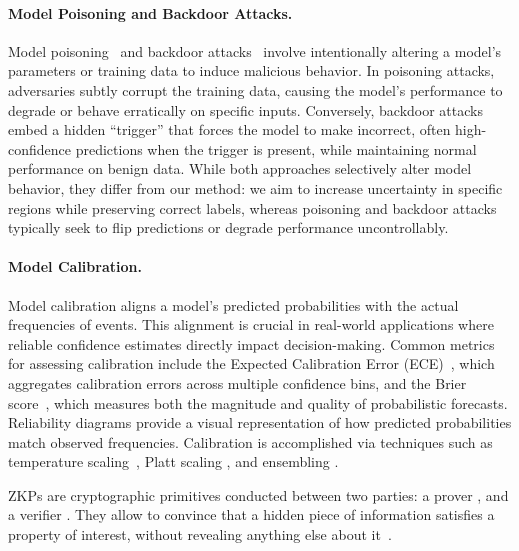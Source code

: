 \paragraph{Model Poisoning and Backdoor Attacks.}
Model poisoning~\citep{steinhardt2017certified} and backdoor attacks~\citep{wang2019neural} involve intentionally altering a model’s parameters or training data to induce malicious behavior. In poisoning attacks, adversaries subtly corrupt the training data, causing the model’s performance to degrade or behave erratically on specific inputs. Conversely, backdoor attacks embed a hidden ``trigger'' that forces the model to make incorrect, often high-confidence predictions when the trigger is present, while maintaining normal performance on benign data. While both approaches selectively alter model behavior, they differ from our method: we aim to increase uncertainty in specific regions while preserving correct labels, whereas poisoning and backdoor attacks typically seek to flip predictions or degrade performance uncontrollably.

\paragraph{Model Calibration.}

Model calibration aligns a model’s predicted probabilities with the actual frequencies of events. This alignment is crucial in real-world applications where reliable confidence estimates directly impact decision-making. Common metrics for assessing calibration include the Expected Calibration Error (ECE)~\citep{naeini2015obtaining}, which aggregates calibration errors across multiple confidence bins, and the Brier score~\citep{brier1950verification}, which measures both the magnitude and quality of probabilistic forecasts. Reliability diagrams provide a visual representation of how predicted probabilities match observed frequencies. Calibration is accomplished via techniques such as temperature scaling~\cite{guo2017calibration}, Platt scaling \cite{platt1999probabilistic}, and ensembling \cite{lakshminarayanan2017simple}.

 ZKPs are cryptographic primitives conducted between two parties: a prover \prover, and a verifier \verifier. They allow \prover to convince \verifier that a hidden piece of information satisfies a property of interest, without revealing anything else about it~\cite{goldwasser1985knowledge}. 

